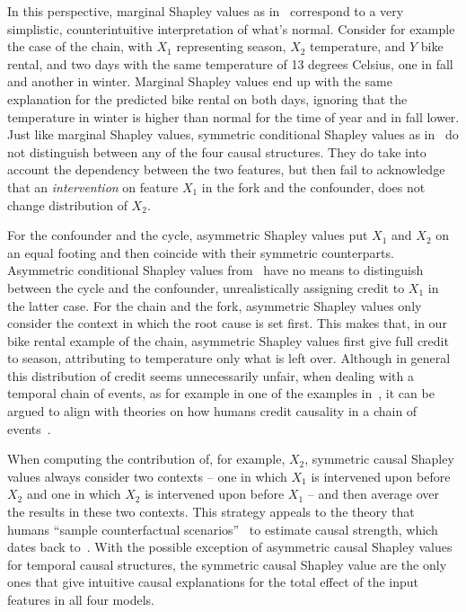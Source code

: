\documentclass{article}
\begin{document}
In this perspective, marginal Shapley values as in~\cite{datta2016algorithmic,janzing2019feature,lundberg2020local} correspond to a very simplistic, counterintuitive interpretation of what's normal. Consider for example the case of the chain, with $X_1$ representing season, $X_2$ temperature, and $Y$ bike rental, and two days with the same temperature of 13 degrees Celsius, one in fall and another in winter. Marginal Shapley values end up with the same explanation for the predicted bike rental on both days, ignoring that the temperature in winter is higher than normal for the time of year and in fall lower. Just like marginal Shapley values, symmetric conditional Shapley values as in~\cite{aas2019explaining} do not distinguish between any of the four causal structures. They do take into account the dependency between the two features, but then fail to acknowledge that an {\em intervention} on feature $X_1$ in the fork and the confounder, does not change distribution of $X_2$.

For the confounder and the cycle, asymmetric Shapley values put $X_1$ and $X_2$ on an equal footing and then coincide with their symmetric counterparts. Asymmetric conditional Shapley values from~\cite{frye2019asymmetric} have no means to distinguish between the cycle and the confounder, unrealistically assigning credit to $X_1$ in the latter case. For the chain and the fork, asymmetric Shapley values only consider the context in which the root cause is set first. This makes that, in our bike rental example of the chain, asymmetric Shapley values first give full credit to season, attributing to temperature only what is left over.
Although in general this distribution of credit seems unnecessarily unfair, when dealing with a temporal chain of events, as for example in one of the examples in~\cite{frye2019asymmetric}, it can be argued to align with theories on how humans credit causality in a chain of events~\cite{spellman1997crediting}.

When computing the contribution of, for example, $X_2$, symmetric causal Shapley values always consider two contexts -- one in which $X_1$ is intervened upon before $X_2$ and one in which $X_2$ is intervened upon before $X_1$ -- and then average over the results in these two contexts. This strategy appeals to the theory that humans ``sample counterfactual scenarios''~\cite{icard2017normality} to estimate causal strength, which dates back to~\cite{lewis1974causation}. With the possible exception of asymmetric causal Shapley values for temporal causal structures, the symmetric causal Shapley value are the only ones that give intuitive causal explanations for the total effect of the input features in all four models.
\end{document}
